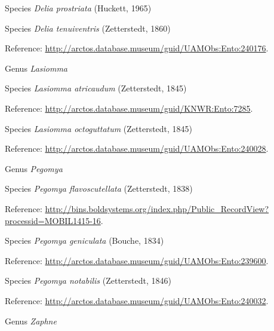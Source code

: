 \documentclass[9pt, article]{memoir}
\begin{document}
\begin{multicols}{2}
\vspace{6pt}\noindent\hspace{36pt}Species \textit{Delia prostriata} (Huckett, 1965)


\vspace{6pt}\noindent\hspace{36pt}Species \textit{Delia tenuiventris} (Zetterstedt, 1860)


Reference: 
\url{http://arctos.database.museum/guid/UAMObs:Ento:240176}.

\vspace{6pt}\noindent\hspace{30pt}Genus \textit{Lasiomma}


\vspace{6pt}\noindent\hspace{36pt}Species \textit{Lasiomma atricaudum} (Zetterstedt, 1845)


Reference: 
\url{http://arctos.database.museum/guid/KNWR:Ento:7285}.

\vspace{6pt}\noindent\hspace{36pt}Species \textit{Lasiomma octoguttatum} (Zetterstedt, 1845)


Reference: 
\url{http://arctos.database.museum/guid/UAMObs:Ento:240028}.

\vspace{6pt}\noindent\hspace{30pt}Genus \textit{Pegomya}


\vspace{6pt}\noindent\hspace{36pt}Species \textit{Pegomya flavoscutellata} (Zetterstedt, 1838)


Reference: 
\url{http://bins.boldsystems.org/index.php/Public_RecordView?processid=MOBIL1415-16}.

\vspace{6pt}\noindent\hspace{36pt}Species \textit{Pegomya geniculata} (Bouche, 1834)


Reference: 
\url{http://arctos.database.museum/guid/UAMObs:Ento:239600}.

\vspace{6pt}\noindent\hspace{36pt}Species \textit{Pegomya notabilis} (Zetterstedt, 1846)


Reference: 
\url{http://arctos.database.museum/guid/UAMObs:Ento:240032}.

\vspace{6pt}\noindent\hspace{30pt}Genus \textit{Zaphne}



\end{multicols}
\end{document}

